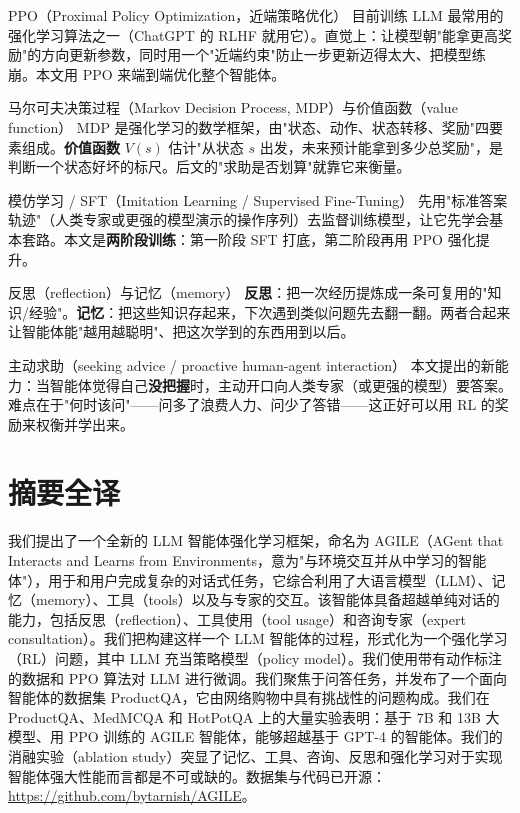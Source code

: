 \documentclass[11pt,UTF8,fontset=fandol]{ctexart}
\begin{document}
\begin{infocard}{PPO（Proximal Policy Optimization，近端策略优化）}
目前训练 LLM 最常用的强化学习算法之一（ChatGPT 的 RLHF 就用它）。直觉上：让模型朝"能拿更高奖励"的方向更新参数，同时用一个"近端约束"防止一步更新迈得太大、把模型练崩。本文用 PPO 来端到端优化整个智能体。
\end{infocard}

\begin{infocard}{马尔可夫决策过程（Markov Decision Process, MDP）与价值函数（value function）}
MDP 是强化学习的数学框架，由"状态、动作、状态转移、奖励"四要素组成。\textbf{价值函数} $V(s)$ 估计"从状态 $s$ 出发，未来预计能拿到多少总奖励"，是判断一个状态好坏的标尺。后文的"求助是否划算"就靠它来衡量。
\end{infocard}

\begin{infocard}{模仿学习 / SFT（Imitation Learning / Supervised Fine-Tuning）}
先用"标准答案轨迹"（人类专家或更强的模型演示的操作序列）去监督训练模型，让它先学会基本套路。本文是\textbf{两阶段训练}：第一阶段 SFT 打底，第二阶段再用 PPO 强化提升。
\end{infocard}

\begin{infocard}{反思（reflection）与记忆（memory）}
\textbf{反思}：把一次经历提炼成一条可复用的"知识/经验"。\textbf{记忆}：把这些知识存起来，下次遇到类似问题先去翻一翻。两者合起来让智能体能"越用越聪明"、把这次学到的东西用到以后。
\end{infocard}

\begin{infocard}{主动求助（seeking advice / proactive human-agent interaction）}
本文提出的新能力：当智能体觉得自己\textbf{没把握}时，主动开口向人类专家（或更强的模型）要答案。难点在于"何时该问"——问多了浪费人力、问少了答错——这正好可以用 RL 的奖励来权衡并学出来。
\end{infocard}

\section{摘要全译}

我们提出了一个全新的 LLM 智能体强化学习框架，命名为 AGILE（AGent that Interacts and Learns from Environments，意为"与环境交互并从中学习的智能体"），用于和用户完成复杂的对话式任务，它综合利用了大语言模型（LLM）、记忆（memory）、工具（tools）以及与专家的交互。该智能体具备超越单纯对话的能力，包括反思（reflection）、工具使用（tool usage）和咨询专家（expert consultation）。我们把构建这样一个 LLM 智能体的过程，形式化为一个强化学习（RL）问题，其中 LLM 充当策略模型（policy model）。我们使用带有动作标注的数据和 PPO 算法对 LLM 进行微调。我们聚焦于问答任务，并发布了一个面向智能体的数据集 ProductQA，它由网络购物中具有挑战性的问题构成。我们在 ProductQA、MedMCQA 和 HotPotQA 上的大量实验表明：基于 7B 和 13B 大模型、用 PPO 训练的 AGILE 智能体，能够超越基于 GPT-4 的智能体。我们的消融实验（ablation study）突显了记忆、工具、咨询、反思和强化学习对于实现智能体强大性能而言都是不可或缺的。数据集与代码已开源：\url{https://github.com/bytarnish/AGILE}。
\end{document}
